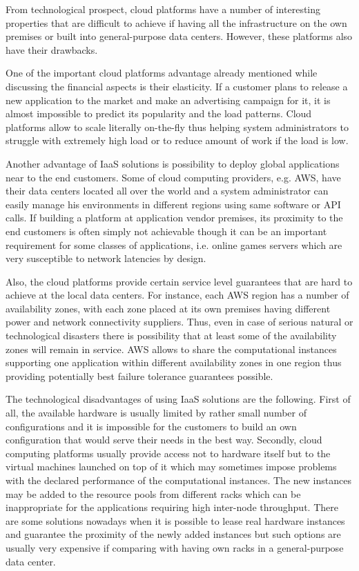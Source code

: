 \documentclass[conference]{IEEEtran}
\begin{document}
From technological prospect, cloud platforms have a number of interesting properties that are difficult to achieve if having all the infrastructure on the own premises or built into general-purpose data centers. However, these platforms also have their drawbacks.

One of the important cloud platforms advantage already mentioned while discussing the financial aspects is their elasticity. If a customer plans to release a new application to the market and make an advertising campaign for it, it is almost impossible to predict its popularity and the load patterns. Cloud platforms allow to scale literally on-the-fly thus helping system administrators to struggle with extremely high load or to reduce amount of work if the load is low.

Another advantage of IaaS solutions is possibility to deploy global applications near to the end customers. Some of cloud computing providers, e.g. AWS, have their data centers located all over the world and a system administrator can easily manage his environments in different regions using same software or API calls. If building a platform at application vendor premises, its proximity to the end customers is often simply not achievable though it can be an important requirement for some classes of applications, i.e. online games servers which are very susceptible to network latencies by design.

Also, the cloud platforms provide certain service level guarantees that are hard to achieve at the local data centers. For instance, each AWS region has a number of availability zones, with each zone placed at its own premises having different power and network connectivity suppliers. Thus, even in case of serious natural or technological disasters there is possibility that at least some of the availability zones will remain in service. AWS allows to share the computational instances supporting one application within different availability zones in one region thus providing potentially best failure tolerance guarantees possible.

The technological disadvantages of using IaaS solutions are the following. First of all, the available hardware is usually limited by rather small number of configurations and it is impossible for the customers to build an own configuration that would serve their needs in the best way. Secondly, cloud computing platforms usually provide access not to hardware itself but to the virtual machines launched on top of it which may sometimes impose problems with the declared performance of the computational instances. The new instances may be added to the resource pools from different racks which can be inappropriate for the applications requiring high inter-node throughput. There are some solutions nowadays when it is possible to lease real hardware instances and guarantee the proximity of the newly added instances but such options are usually very expensive if comparing with having own racks in a general-purpose data center.
\end{document}
